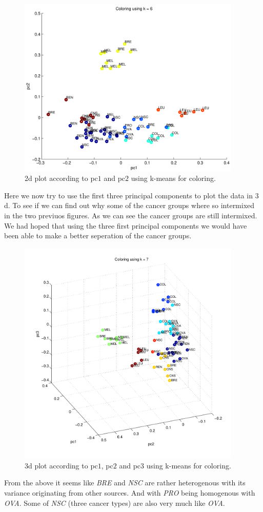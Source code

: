 \begin{figure}[!htbp]
  \centering \includegraphics[width=0.95\textwidth]{./images/q34pcs3}
  \caption{2d plot according to pc$1$ and pc$2$ using k-means for
    coloring.}
  \label{fig:q34pcs3}
\end{figure}

\newpage

Here we now try to use the first three principal components to plot
the data in $3$d. To see if we can find out why some of the cancer
groups where so intermixed in the two previuos figures. As we can see
the cancer groups are still intermixed. We had hoped that using the
three first principal components we would have been able to make a
better seperation of the cancer groups.

\begin{figure}[!htbp]
  \centering \includegraphics[width=0.95\textwidth]{./images/q34pcs4}
  \caption{3d plot according to pc$1$, pc$2$ and pc$3$ using k-means
    for coloring.}
  \label{fig:q34pcs4}
\end{figure}

From the above it seems like \emph{BRE} and \emph{NSC} are rather
heterogenous with its variance originating from other sources. And
with \emph{PRO} being homogenous with \emph{OVA}. Some of \emph{NSC}
(three cancer types) are also very much like \emph{OVA}.
